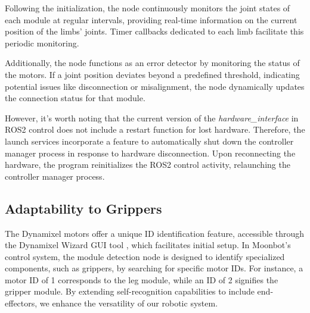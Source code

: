 

Following the initialization, the node continuously monitors the joint states of each module at regular intervals, providing real-time information on the current position of the limbs' joints. Timer callbacks dedicated to each limb facilitate this periodic monitoring.

Additionally, the node functions as an error detector by monitoring the status of the motors. If a joint position deviates beyond a predefined threshold, indicating potential issues like disconnection or misalignment, the node dynamically updates the connection status for that module.

However, it's worth noting that the current version of the \textit{hardware\_interface} in ROS2 control does not include a restart function for lost hardware. Therefore, the launch services incorporate a feature to automatically shut down the controller manager process in response to hardware disconnection. Upon reconnecting the hardware, the program reinitializes the ROS2 control activity, relaunching the controller manager process.

\subsection{Adaptability to Grippers}
The Dynamixel motors offer a unique ID identification feature, accessible through the Dynamixel Wizard GUI tool \cite{dynamixel_wizard2}, which facilitates initial setup. In Moonbot's control system, the module detection node is designed to identify specialized components, such as grippers, by searching for specific motor IDs. For instance, a motor ID of 1 corresponds to the leg module, while an ID of 2 signifies the gripper module. By extending self-recognition capabilities to include end-effectors, we enhance the versatility of our robotic system.\\

